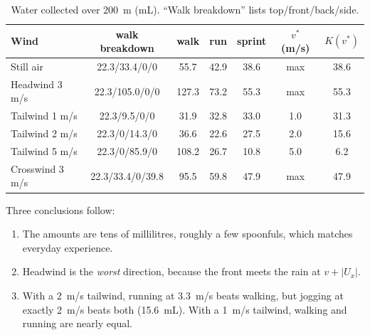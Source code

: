 \documentclass[11pt,a4paper]{article}
\begin{document}
\begin{table}[h]\centering
\caption{Water collected over \SI{200}{m} (mL). ``Walk breakdown'' lists top/front/back/side.}\label{tab:results}
\begin{tabular}{lcccccc}\toprule
Wind & walk breakdown & walk & run & sprint & $v^\ast$ (m/s) & $K(v^\ast)$\\\midrule
Still air & 22.3/33.4/0/0 & 55.7 & 42.9 & 38.6 & max & 38.6\\
Headwind 3 m/s & 22.3/105.0/0/0 & 127.3 & 73.2 & 55.3 & max & 55.3\\
Tailwind 1 m/s & 22.3/9.5/0/0 & 31.9 & 32.8 & 33.0 & 1.0 & 31.3\\
Tailwind 2 m/s & 22.3/0/14.3/0 & 36.6 & 22.6 & 27.5 & 2.0 & 15.6\\
Tailwind 5 m/s & 22.3/0/85.9/0 & 108.2 & 26.7 & 10.8 & 5.0 & 6.2\\
Crosswind 3 m/s & 22.3/33.4/0/39.8 & 95.5 & 59.8 & 47.9 & max & 47.9\\\bottomrule
\end{tabular}
\end{table}

Three conclusions follow:
\begin{enumerate}
\item The amounts are tens of millilitres, roughly a few spoonfuls, which matches everyday experience.
\item Headwind is the \emph{worst} direction, because the front meets the rain at $v+|U_x|$.
\item With a \SI{2}{m/s} tailwind, running at \SI{3.3}{m/s} beats walking, but jogging at exactly \SI{2}{m/s} beats both (\SI{15.6}{mL}). With a \SI{1}{m/s} tailwind, walking and running are nearly equal.
\end{enumerate}
\end{document}
